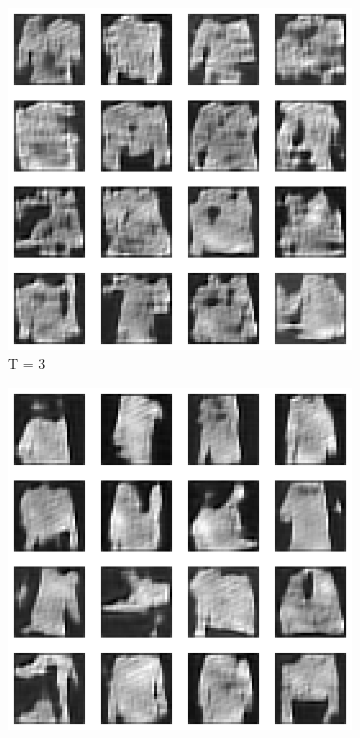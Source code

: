 \documentclass{article}
\begin{document}
\begin{figure}[H]
	\begin{subfigure}[h]{0.3\linewidth}
		\centering
		\includegraphics[scale=0.3]{../code/figures/generated_DDGAN_tv_3.png}
		\caption{T = 3}
	\end{subfigure}
	\hfill
	\begin{subfigure}[h]{0.3\linewidth}
		\centering
		\includegraphics[scale=0.3]{../code/figures/generated_DDGAN_tv_5.png}

\end{subfigure}
\end{figure}
\end{document}
